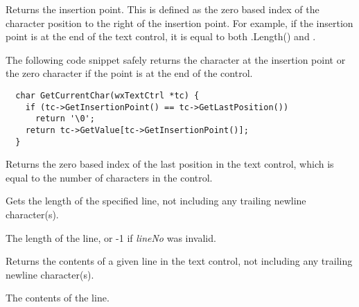 Returns the insertion point. This is defined as the zero based index of the
character position to the right of the insertion point. For example, if
the insertion point is at the end of the text control, it is equal to
both .Length() and
.

The following code snippet safely returns the character at the insertion
point or the zero character if the point is at the end of the control.

{\small%
\begin{verbatim}
  char GetCurrentChar(wxTextCtrl *tc) {
    if (tc->GetInsertionPoint() == tc->GetLastPosition())
      return '\0';
    return tc->GetValue[tc->GetInsertionPoint()];
  }
\end{verbatim}
}%

\label{wxtextctrlgetlastposition}


Returns the zero based index of the last position in the text control,
which is equal to the number of characters in the control.

\label{wxtextctrlgetlinelength}


Gets the length of the specified line, not including any trailing newline
character(s).




The length of the line, or -1 if {\it lineNo} was invalid.

\label{wxtextctrlgetlinetext}


Returns the contents of a given line in the text control, not including
any trailing newline character(s).




The contents of the line.

\label{wxtextctrlgetnumberoflines}

